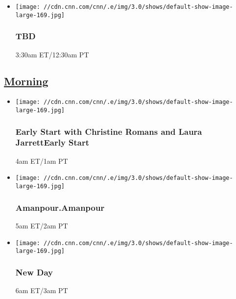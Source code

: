 \begin{itemize}
\item
  \texttt{[image: //cdn.cnn.com/cnn/.e/img/3.0/shows/default-show-image-large-169.jpg]}

  \hypertarget{tbd-6}{%
  \subsubsection{TBD}\label{tbd-6}}

  3:30am ET/12:30am PT
\end{itemize}

\hypertarget{morning--5}{%
\subsection{\texorpdfstring{\href{/tv/schedule/cnn/index.html}{Morning}~}{Morning~}}\label{morning--5}}

\begin{itemize}
\item
  \texttt{[image: //cdn.cnn.com/cnn/.e/img/3.0/shows/default-show-image-large-169.jpg]}

  \hypertarget{early-start-with-christine-romans-and-laura-jarrettearly-start--3}{%
  \subsubsection{Early Start with Christine Romans and Laura
  JarrettEarly Start
  }\label{early-start-with-christine-romans-and-laura-jarrettearly-start--3}}

  4am ET/1am PT
\end{itemize}

\begin{itemize}
\item
  \texttt{[image: //cdn.cnn.com/cnn/.e/img/3.0/shows/default-show-image-large-169.jpg]}

  \hypertarget{amanpouramanpour--8}{%
  \subsubsection{Amanpour.Amanpour }\label{amanpouramanpour--8}}

  5am ET/2am PT
\end{itemize}

\begin{itemize}
\item
  \texttt{[image: //cdn.cnn.com/cnn/.e/img/3.0/shows/default-show-image-large-169.jpg]}

  \hypertarget{new-day-6}{%
  \subsubsection{New Day}\label{new-day-6}}

  6am ET/3am PT
\end{itemize}

